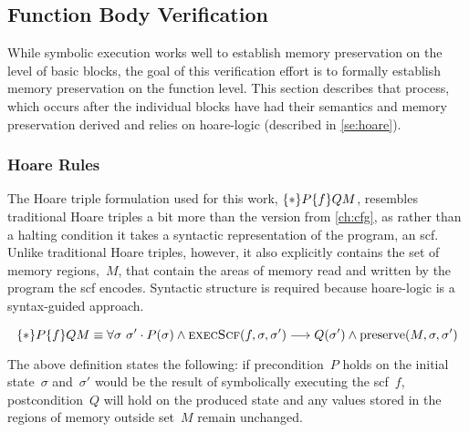 \subsection{Function Body Verification}
While symbolic execution works well to establish memory preservation on the level of basic blocks,
the goal of this verification effort is to formally establish memory preservation
on the function level. This section describes that process,
which occurs after the individual blocks have had their semantics and memory preservation derived
and relies on \gls{hoare-logic} (described in \cref{se:hoare}).

\subsubsection{Hoare Rules}\label{scf_hoare}
The Hoare triple formulation used for this work, $\{*\}P\{f\}{Q}M$,
resembles traditional Hoare triples a bit more than the version from \cref{ch:cfg},%
as rather than a halting condition
it takes a syntactic representation of the program, an \ac{scf}.
Unlike traditional Hoare triples, however,
it also explicitly contains the set of memory regions,~$M$,
that contain the areas of memory read and written by the program the \ac{scf} encodes.
Syntactic structure is required because \gls{hoare-logic} is a syntax-guided approach.
\begin{definition}\label{def:preserve}
  \begin{equation}
    \{*\}P\{f\}{Q}{M}\equiv
    \forall\sigma~\sigma'\cdot P(\sigma)\land\operatorname{\textsc{execScf}}(f,\sigma,\sigma')\longrightarrow
    Q(\sigma')\land\operatorname{preserve}(M,\sigma,\sigma')
  \end{equation}
\end{definition}
The above definition states the following:
if precondition~$P$ holds on the initial state~$\sigma$
and~$\sigma'$ would be the result of symbolically executing the \ac{scf}~$f$,
postcondition~$Q$ will hold on the produced state
and any values stored in the regions of memory outside set~$M$ remain unchanged.

